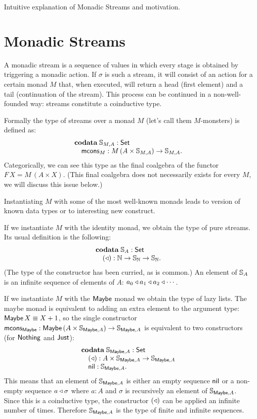 \documentclass{article}
\begin{document}
Intuitive explanation of Monadic Streams and motivation.

\section{Monadic Streams}

A monadic stream is a sequence of values in which every stage is obtained by triggering a monadic action.
If $\sigma$ is such a stream, it will consist of an action for a certain monad $M$ that, when executed, will return a head (first element) and a tail (continuation of the stream).
This process can be continued in a non-well-founded way: streams constitute a coinductive type.

Formally the type of streams over a monad $M$ (let's call them $M$-monsters) is defined as:
$$
\begin{array}[t]{l}
\mathbf{codata}\;
\mathbb{S}_{M,A}:\mathsf{Set}\\
\quad \mathsf{mcons}_M: M\,(A\times \mathbb{S}_{M,A})\rightarrow\mathbb{S}_{M,A}.
\end{array}
$$
Categorically, we can see this type as the final coalgebra of the functor $F\,X = M\,(A\times X)$. (This final coalgebra does not necessarily exists for every $M$, we will discuss this issue below.)


Instantiating $M$ with some of the most well-known monads leads to version of known data types or to interesting new construct.

If we instantiate $M$ with the identity monad, we obtain the type of pure streams.
Its usual definition is the following:
$$
\begin{array}[t]{l}
\mathbf{codata}\;
\mathbb{S}_{A}:\mathsf{Set}\\
\quad (\triangleleft): \mathbb{N}\rightarrow \mathbb{S}_{\mathbb{N}} \rightarrow\mathbb{S}_{\mathbb{N}}.
\end{array}
$$
(The type of the constructor has been curried, as is common.)
An element of $\mathbb{S}_{A}$ is an infinite sequence of elements of $A$: $a_0 \triangleleft a_1\triangleleft a_2\triangleleft \cdots$.

If we instantiate $M$ with the $\mathsf{Maybe}$ monad we obtain the type of lazy lists.
The maybe monad is equivalent to adding an extra element to the argument type: $\mathsf{Maybe}\,X \equiv X+1$, so the single constructor $\mathsf{mcons}_{\mathsf{Maybe}}: \mathsf{Maybe}\,(A\times \mathbb{S}_{\mathsf{Maybe},A})\rightarrow\mathbb{S}_{\mathsf{Maybe},A}$ is equivalent to two constructors (for $\mathsf{Nothing}$ and $\mathsf{Just}$):
$$
\begin{array}[t]{l}
\mathbf{codata}\;
\mathbb{S}_{\mathsf{Maybe},A}:\mathsf{Set}\\
\quad (\triangleleft): A\times \mathbb{S}_{\mathsf{Maybe},A}\rightarrow\mathbb{S}_{\mathsf{Maybe},A}\\
\quad \mathsf{nil}: \mathbb{S}_{\mathsf{Maybe},A}.
\end{array}
$$
This means that an element of $\mathbb{S}_{\mathsf{Maybe},A}$ is either an empty sequence $\mathsf{nil}$ or a non-empty sequence $a\triangleleft \sigma$ where $a:A$ and $\sigma$ is recursively an element of $\mathbb{S}_{\mathsf{Maybe},A}$.
Since this is a coinductive type, the constructor $(\triangleleft)$ can be applied an infinite number of times.
Therefore $\mathbb{S}_{\mathsf{Maybe},A}$ is the type of finite and infinite sequences.
\end{document}
